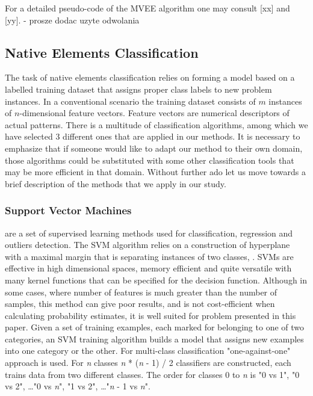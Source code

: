 \documentclass{llncs}
\begin{document}
{\color{blue}For a detailed pseudo-code of the MVEE algorithm one may consult [xx] and [yy]. - prosze dodac uzyte odwolania}

\subsection{Native Elements Classification}

The task of native elements classification relies on forming a model based on a labelled training dataset that assigns proper class labels to new problem instances. In a conventional scenario the training dataset consists of $m$ instances of $n$-dimensional feature vectors. Feature vectors are numerical descriptors of actual patterns. There is a multitude of classification algorithms, among which we have selected 3 different ones that are applied in our methods. It is necessary to emphasize that if someone would like to adapt our method to their own domain, those algorithms could be substituted with some other classification tools that may be more efficient in that domain. Without further ado let us move towards a brief description of the methods that we apply in our study.

\subsubsection{Support Vector Machines}

are a set of supervised learning methods used for classification, regression and outliers detection. The SVM algorithm relies on a construction of hyperplane with a maximal margin that is separating instances of two classes, \cite{CortesVapnik1995}. SVMs are effective in high dimensional spaces, memory efficient and quite versatile with many kernel functions that can be specified for the decision function. Although in some cases, where number of features is much greater than the number of samples, this method can give poor results, and is not cost-efficient when calculating probability estimates, it is well suited for problem presented in this paper. Given a set of training examples, each marked for belonging to one of two categories, an SVM training algorithm builds a model that assigns new examples into one category or the other. For multi-class classification "one-against-one" approach is used. For \textit{n} classes \textit{n} * (\textit{n} - 1) / 2 classifiers are constructed, each trains data from two different classes. The order for classes 0 to \textit{n} is "0 vs 1", "0 vs 2", \dots "0 vs \textit{n}", "1 vs 2", \dots "\textit{n} - 1 vs \textit{n}".
\end{document}
